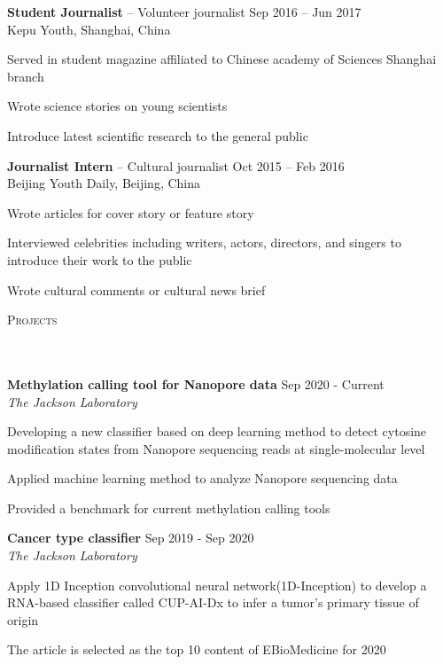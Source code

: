 \documentclass{article}
\newcommand{\header}[1]{{
\hspace*{-15pt}\vspace*{6pt} \textsc{#1}} \vspace*{-6pt} 
\lineunder
}
\newcommand{\lineunder}{
\vspace*{-8pt} \\ \hspace*{-18pt} 
\hrulefill \\
}
\newcommand{\employer}[4]{{
\vspace*{2pt}%
\textbf{#1} #2 \hfill #3\\ #4 \vspace*{2pt}}
}
\newcommand{\project}[4]{{
\vspace*{2pt}%
\textbf{#1} #2 \hfill #3\\ \textit{#4} \vspace*{2pt}}
}
\renewcommand{\labelitemii}{
$\vcenter{\hbox{\tiny$\bullet$}}$\hspace*{-3pt}
}
\newenvironment{bullet-list-minor}{
\begin{list}{\labelitemii}{\setlength\leftmargin{15pt} 
\topsep 0pt \itemsep -2pt}}{\vspace*{4pt}\end{list}
}
\begin{document}
    \employer{Student Journalist}{-- Volunteer journalist}{Sep 2016 -- Jun 2017}{Kepu Youth, Shanghai, China}
	\begin{bullet-list-minor}
	\item Served in student magazine affiliated to Chinese academy of Sciences Shanghai branch
	\item Wrote science stories on young scientists 
	\item Introduce latest scientific research to the general public  
    \end{bullet-list-minor}

    \employer{Journalist Intern}{-- Cultural journalist}{Oct 2015 -- Feb 2016}{Beijing Youth Daily, Beijing, China}
	\begin{bullet-list-minor}
	\item Wrote articles for cover story or feature story
	\item Interviewed celebrities including writers, actors, directors, and singers to introduce their work to the public  \item Wrote cultural comments or cultural news brief
    \end{bullet-list-minor}

\vspace*{4pt}%
\header{Projects}
    \project{Methylation calling tool for Nanopore data}{}{Sep 2020 - Current }{The Jackson Laboratory}
	\begin{bullet-list-minor}
	\item Developing a new classifier based on deep learning method to detect cytosine modification states from Nanopore sequencing reads at single-molecular level 
	\item Applied machine learning method to analyze Nanopore sequencing data
	\item Provided a benchmark for current methylation calling tools
    \end{bullet-list-minor}

    \project{Cancer type classifier}{}{Sep 2019 - Sep 2020}{The Jackson Laboratory}
	\begin{bullet-list-minor}
	\item Apply 1D Inception convolutional neural network(1D-Inception) to develop a RNA-based classifier called CUP-AI-Dx to infer a tumor's primary tissue of origin
	\item The article is selected as the top 10 content of EBioMedicine for 2020
    \end{bullet-list-minor}
\end{document}
